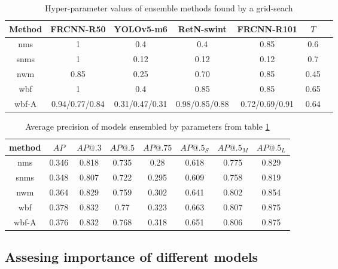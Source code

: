 \begin{table}[H]
    \begin{tabular}{|c|c|c|c|c|c|c|}
        \hline
        Method & FRCNN-R50      & YOLOv5-m6      & RetN-swint     & FRCNN-R101     & $T$  \\ \hline
        nms    & 1              & 0.4            & 0.4            & 0.85           & 0.6  \\ \hline
        snms   & 1              & 0.12           & 0.12           & 0.12           & 0.7  \\ \hline
        nwm    & 0.85           & 0.25           & 0.70           & 0.85           & 0.45 \\ \hline
        wbf    & 1              & 0.4            & 0.85           & 0.85           & 0.65 \\ \hline
        wbf-A  & 0.94/0.77/0.84 & 0.31/0.47/0.31 & 0.98/0.85/0.88 & 0.72/0.69/0.91 & 0.64 \\ \hline
    \end{tabular}
    \caption{Hyper-parameter values of ensemble methods found by a grid-seach}
    \label{tab:ensemble_params:grid_search}
\end{table}


\begin{table}[H]
    \centering
    \begin{tabular}{|c|c|c|c|c|c|c|c|}
        \hline
        method & $AP$  & $AP@.3$ & $AP@.5$ & $AP@.75$ & $AP@.5_S$ & $AP@.5_M$ & $AP@.5_L$ \\ \hline
        nms    & 0.346 & 0.818   & 0.735   & 0.28     & 0.618     & 0.775     & 0.829     \\ \hline
        snms   & 0.348 & 0.807   & 0.722   & 0.295    & 0.609     & 0.758     & 0.819     \\ \hline
        nwm    & 0.364 & 0.829   & 0.759   & 0.302    & 0.641     & 0.802     & 0.854     \\ \hline
        wbf    & 0.378 & 0.832   & 0.77    & 0.323    & 0.663     & 0.807     & 0.875     \\ \hline
        wbf-A  & 0.376 & 0.832   & 0.768   & 0.318    & 0.651     & 0.806     & 0.875     \\ \hline
    \end{tabular}
    \caption{Average precision of models ensembled by parameters from table \ref{tab:ensemble_params:grid_search}}
    \label{tab:precision:grid_search}
\end{table}


\subsection{Assesing importance of different models}

